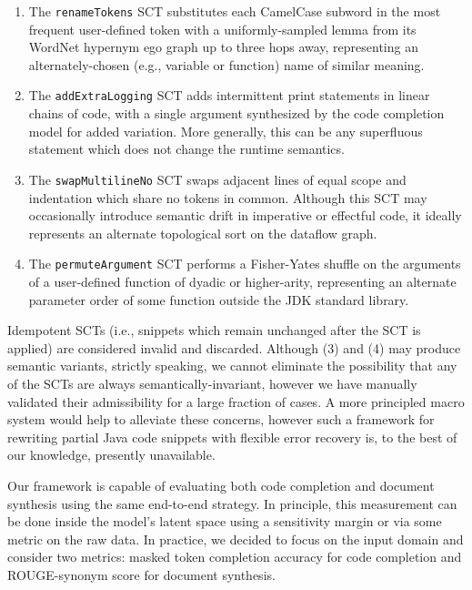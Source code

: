 \documentclass[usenames,dvipsnames]{article} %
\begin{document}
  \begin{enumerate}[itemsep=1ex]
    \item The \lstinline|renameTokens| SCT substitutes each CamelCase subword in the most frequent user-defined token with a uniformly-sampled lemma from its WordNet hypernym ego graph up to three hops away, representing an alternately-chosen (e.g., variable or function) name of similar meaning.
    \item The \lstinline|addExtraLogging| SCT adds intermittent print statements in linear chains of code, with a single argument synthesized by the code completion model for added variation. More generally, this can be any superfluous statement which does not change the runtime semantics.
    \item The \lstinline|swapMultilineNo| SCT swaps adjacent lines of equal scope and indentation which share no tokens in common. Although this SCT may occasionally introduce semantic drift in imperative or effectful code, it ideally represents an alternate topological sort on the dataflow graph.
    \item The \lstinline|permuteArgument| SCT performs a Fisher-Yates shuffle on the arguments of a user-defined function of dyadic or higher-arity, representing an alternate parameter order of some function outside the JDK standard library.
  \end{enumerate}

  Idempotent SCTs (i.e., snippets which remain unchanged after the SCT is applied) are considered invalid and discarded. Although (3) and (4) may produce semantic variants, strictly speaking, we cannot eliminate the possibility that any of the SCTs are always semantically-invariant, however we have manually validated their admissibility for a large fraction of cases. A more principled macro system would help to alleviate these concerns, however such a framework for rewriting partial Java code snippets with flexible error recovery is, to the best of our knowledge, presently unavailable.

  Our framework is capable of evaluating both code completion and document synthesis using the same end-to-end strategy. In principle, this measurement can be done inside the model's latent space using a sensitivity margin or via some metric on the raw data. In practice, we decided to focus on the input domain and consider two metrics: masked token completion accuracy for code completion and ROUGE-synonym score for document synthesis.

  \pagebreak
\end{document}

